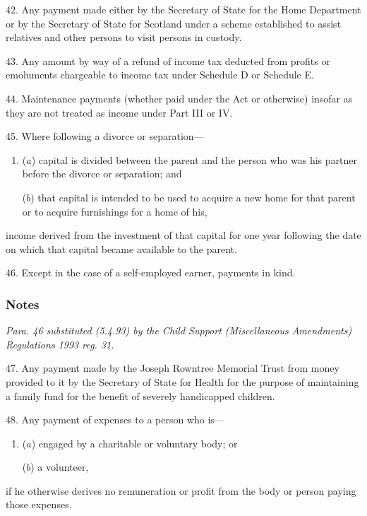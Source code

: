 \documentclass[a4paper]{article}
\newcommand\amendment[1]{\subsubsection*{Notes}{\itshape\frenchspacing\footnotesize #1 \par\goodbreak}}
\begin{document}
\medskip

42.  Any payment made either by the Secretary of State for the Home Department or by the Secretary of State for Scotland under a scheme established to assist relatives and other persons to visit persons in custody.

\medskip

43.  Any amount by way of a refund of income tax deducted from profits or emoluments chargeable to income tax under Schedule D or Schedule E.

\medskip

44.  Maintenance payments (whether paid under the Act or otherwise) insofar as they are not treated as income under Part III or IV.

\medskip

45.  Where following a divorce or separation—
\begin{enumerate}\item[]
($a$) capital is divided between the parent and the person who was his partner before the divorce or separation; and

($b$) that capital is intended to be used to acquire a new home for that parent or to acquire furnishings for a home of his,
\end{enumerate}
income derived from the investment of that capital for one year following the date on which that capital became available to the parent.

\medskip

46.  Except in the case of a self-employed earner, payments in kind.

\amendment{
Para. 46 substituted (5.4.93) by the Child Support (Miscellaneous Amendments) Regulations 1993 reg. 31.
}

\medskip

47.  Any payment made by the Joseph Rowntree Memorial Trust from money provided to it by the Secretary of State for Health for the purpose of maintaining a family fund for the benefit of severely handicapped children.

\medskip

48.  Any payment of expenses to a person who is—
\begin{enumerate}\item[]
($a$) engaged by a charitable or voluntary body; or

($b$) a volunteer,
\end{enumerate}
if he otherwise derives no remuneration or profit from the body or person paying those expenses.
\end{document}
